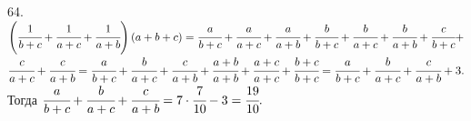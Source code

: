 64. $\left(\cfrac{1}{b+c}+\cfrac{1}{a+c}+\cfrac{1}{a+b}\right)(a+b+c)=\cfrac{a}{b+c}+\cfrac{a}{a+c}+\cfrac{a}{a+b}+
\cfrac{b}{b+c}+\cfrac{b}{a+c}+\cfrac{b}{a+b}+\cfrac{c}{b+c}+$\\$\cfrac{c}{a+c}+\cfrac{c}{a+b}=
\cfrac{a}{b+c}+\cfrac{b}{a+c}+\cfrac{c}{a+b}+\cfrac{a+b}{a+b}+\cfrac{a+c}{a+c}+\cfrac{b+c}{b+c}=\cfrac{a}{b+c}+\cfrac{b}{a+c}+\cfrac{c}{a+b}+3.$
Тогда $\cfrac{a}{b+c}+\cfrac{b}{a+c}+\cfrac{c}{a+b}=7\cdot\cfrac{7}{10}-3=\cfrac{19}{10}.$\\
